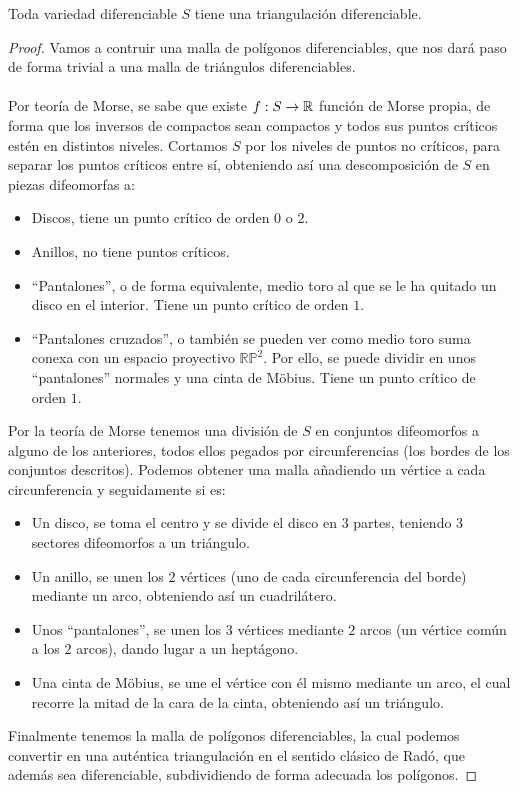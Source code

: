 \begin{hecho}
	Toda variedad diferenciable $S$ tiene una triangulación diferenciable.
\end{hecho}

\begin{proof}
	Vamos a contruir una malla de polígonos diferenciables, que nos dará paso de forma trivial a una malla de triángulos diferenciables.\\
	\\ Por teoría de Morse, se sabe que existe $f:S \rightarrow \mathbb{R}$ función de Morse propia, de forma que los inversos de compactos sean compactos y todos sus puntos críticos estén en distintos niveles. Cortamos $S$ por los niveles de puntos no críticos, para separar los puntos críticos entre sí, obteniendo así una descomposición de $S$ en piezas difeomorfas a:
	\begin{itemize}
		\item Discos, tiene un punto crítico de orden $0$ o $2$.
		\item Anillos, no tiene puntos críticos.
		\item ``Pantalones'', o de forma equivalente, medio toro al que se le ha quitado un disco en el interior. Tiene un punto crítico de orden $1$.
		\item ``Pantalones cruzados'', o también se pueden ver como medio toro suma conexa con un espacio proyectivo $\mathbb{RP}^2$. Por ello, se puede dividir en unos ``pantalones'' normales y una cinta de Möbius. Tiene un punto crítico de orden $1$.
	\end{itemize} 
	
	Por la teoría de Morse tenemos una división de $S$ en conjuntos difeomorfos a alguno de los anteriores, todos ellos pegados por circunferencias (los bordes de los conjuntos descritos). Podemos obtener una malla añadiendo un vértice a cada circunferencia y seguidamente si es:
	\begin{itemize}
		\item Un disco, se toma el centro y se divide el disco en $3$ partes, teniendo $3$ sectores difeomorfos a un triángulo.
		\item Un anillo, se unen los $2$ vértices (uno de cada circunferencia del borde) mediante un arco, obteniendo así un cuadrilátero.
		\item Unos ``pantalones'', se unen los $3$ vértices mediante $2$ arcos (un vértice común a los $2$ arcos), dando lugar a un heptágono.
		\item Una cinta de Möbius, se une el vértice con él mismo mediante un arco, el cual recorre la mitad de la cara de la cinta, obteniendo así un triángulo.
	\end{itemize} 
	
	Finalmente tenemos la malla de polígonos diferenciables, la cual podemos convertir en una auténtica triangulación en el sentido clásico de Radó, que además sea diferenciable, subdividiendo de forma adecuada los polígonos.
\end{proof}

